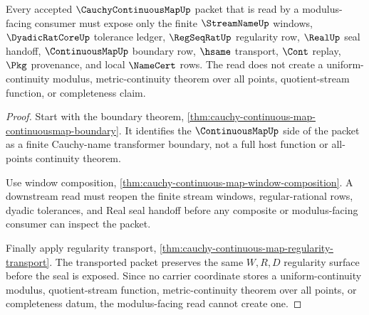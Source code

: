 \begin{theorem}
\label{thm:cauchy-continuous-map-modulus-boundary-nonescape}
Every accepted $\CauchyContinuousMapUp$ packet that is read by a modulus-facing consumer must expose only the finite $\StreamNameUp$ windows, $\DyadicRatCoreUp$ tolerance ledger, $\RegSeqRatUp$ regularity row, $\RealUp$ seal handoff, $\ContinuousMapUp$ boundary row, $\hsame$ transport, $\Cont$ replay, $\Pkg$ provenance, and local $\NameCert$ rows. The read does not create a uniform-continuity modulus, metric-continuity theorem over all points, quotient-stream function, or completeness claim.
\end{theorem}
\begin{proof}
Start with the boundary theorem, \autoref{thm:cauchy-continuous-map-continuousmap-boundary}. It identifies the $\ContinuousMapUp$ side of the packet as a finite Cauchy-name transformer boundary, not a full host function or all-points continuity theorem.

Use window composition, \autoref{thm:cauchy-continuous-map-window-composition}. A downstream read must reopen the finite stream windows, regular-rational rows, dyadic tolerances, and Real seal handoff before any composite or modulus-facing consumer can inspect the packet.

Finally apply regularity transport, \autoref{thm:cauchy-continuous-map-regularity-transport}. The transported packet preserves the same $W,R,D$ regularity surface before the seal is exposed. Since no carrier coordinate stores a uniform-continuity modulus, quotient-stream function, metric-continuity theorem over all points, or completeness datum, the modulus-facing read cannot create one.
\end{proof}

